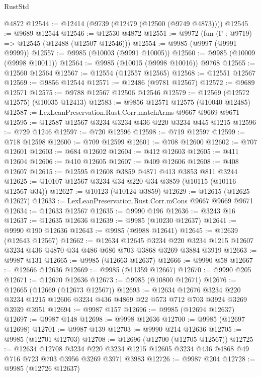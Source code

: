 \begin{lexlean}{RustStd}
\begin{coremodule}
    @4872
@12544 := @12414 (@9739 (@12479 (@12500 (@9749 @4873))))
@12545 := @9689 @12544
@12546 := @12530 @4872
@12551 := @9972 (fun (Γ : @9719) => @12545 (@12488 (@12507 @12546)))
@12554 := @9985 (@9997 (@9991 @9999))
@12557 := @9985 (@10003 (@9991 @10005))
@12560 := @9985 (@10009 (@9998 @10011))
@12564 := @9985 (@10015 (@9998 @10016)) @9768
@12565 := @12560 @12564
@12567 := @12554 (@12557 @12565)
@12568 := @12551 @12567
@12569 := @9856 @12544
@12571 := @12486 (@9781 @12567)
@12572 := @9689 @12571
@12575 := @9788 @12567 @12506 @12546
@12579 := @12569 (@12572 @12575) (@10035 @12413)
@12583 := @9856 @12571 @12575 (@10040 @12485)
@12587 := LexLeanPreservation.Rust.Corr.matchArms @9667 @9669 @9671
@12595 := @12587 @12567 @3234 @3234 @436 @220 @3234 @445 @1215
@12596 := @729 @1246
@12597 := @720 @12596
@12598 := @719 @12597
@12599 := @718 @12598
@12600 := @709 @12599
@12601 := @708 @12600
@12602 := @707 @12601
@12603 := @684 @12602
@12604 := @412 @12603
@12605 := @411 @12604
@12606 := @410 @12605
@12607 := @409 @12606
@12608 := @408 @12607
@12615 := @12595 @12608 @3859 @4871 @413 @3853 @811 @3244
@12625 := @10107 @12567 @3234 @34 @220 @34 @3859 (@10115 (@10116 @12567 @34))
@12627 := @10123 (@10124 @3859)
@12629 := @12615 (@12625 @12627)
@12633 := LexLeanPreservation.Rust.Corr.mCons @9667 @9669 @9671
@12634 := @12633 @12567
@12635 := @9990 @196
@12636 := @3243 @16
@12637 := @12635 @12636
@12639 := @9985 (@10230 @12637)
@12641 := @9990 @190 @12636
@12643 := @9985 (@9988 @12641)
@12645 := @12639 (@12643 @12567)
@12662 := @12634
    @12645
    @3234
    @220
    @3234
    @1215
    @12607
    @3234
    @436
    @4870
    @34
    @486
    @686
    @703
    @3868
    @3269
    @3884
    @3919
@12663 := @9987 @131
@12665 := @9985 (@12663 @12637)
@12666 := @9990 @58
@12667 := @12666 @12636
@12669 := @9985 (@11359 @12667)
@12670 := @9990 @205
@12671 := @12670 @12636
@12673 := @9985 (@10800 @12671)
@12676 := @12665 (@12669 (@12673 @12567))
@12693 := @12634
    @12676
    @3234
    @220
    @3234
    @1215
    @12606
    @3234
    @436
    @4869
    @22
    @573
    @712
    @703
    @3924
    @3269
    @3939
    @3951
@12694 := @9987 @157
@12696 := @9985 (@12694 @12637)
@12697 := @9987 @148
@12698 := @9998 @12636
@12700 := @9985 (@12697 @12698)
@12701 := @9987 @139
@12703 := @9990 @214 @12636
@12705 := @9985 (@12701 @12703)
@12708 := @12696 (@12700 (@12705 @12567))
@12725 := @12634
    @12708
    @3234
    @220
    @3234
    @1215
    @12605
    @3234
    @436
    @4868
    @49
    @716
    @723
    @703
    @3956
    @3269
    @3971
    @3983
@12726 := @9987 @204
@12728 := @9985 (@12726 @12637)

\end{coremodule}
\end{lexlean}
